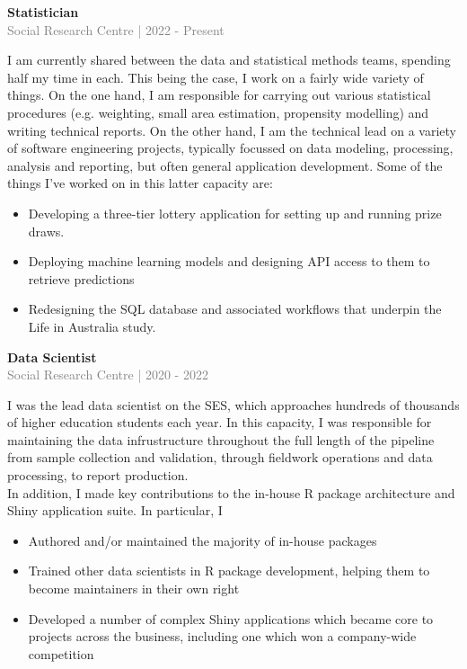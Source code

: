 \documentclass[10pt]{article}
\begin{document}
{\bf Statistician} \\
\textcolor{gray}{Social Research Centre | 2022 - Present} \\[3pt]
\begin{small}
I am currently shared between the data and statistical methods teams, spending half my time in each. 
This being the case, I work on a fairly wide variety of things. 
On the one hand, I am responsible for carrying out various statistical procedures (e.g. weighting, 
small area estimation, propensity modelling) and writing technical reports. 
On the other hand, I am the technical lead on a variety of software engineering projects, 
typically focussed on data modeling, processing, analysis and reporting, but often general 
application development. Some of the things I've worked on in this latter capacity are:

\begin{itemize}
  \item Developing a three-tier lottery application for setting up and running prize draws.
  \item Deploying machine learning models and designing API access to them to retrieve predictions
  \item Redesigning the SQL database and associated workflows that underpin the Life in Australia study.
\end{itemize}

\end{small}

\vspace{0.5cm}
{\bf Data Scientist} \\
\textcolor{gray}{Social Research Centre | 2020 - 2022} \\[3pt]
\begin{small}
I was the lead data scientist on the SES, which approaches hundreds of thousands of higher education students each year. In this capacity, I was responsible for maintaining the data infrustructure throughout the full length of the pipeline from sample collection and validation, through fieldwork operations and data processing, to report production.
\\

In addition, I made key contributions to the in-house R package architecture and Shiny application suite. In particular, I

\begin{itemize}
  \item Authored and/or maintained the majority of in-house packages
  \item Trained other data scientists in R package development, helping them to become maintainers in their own right
  \item Developed a number of complex Shiny applications which became core to projects across the business, including one which won a company-wide competition
\end{itemize}
\end{small}
\end{document}
